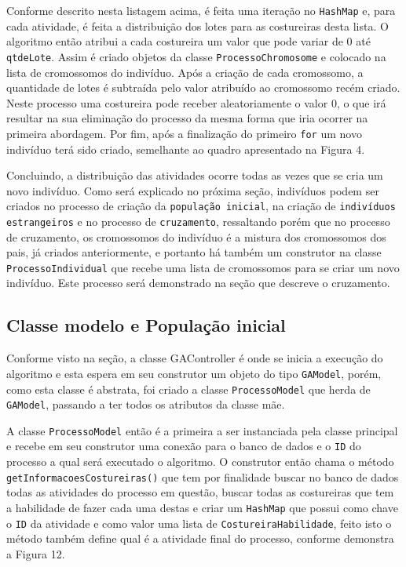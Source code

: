 \newpage
 
\par Conforme descrito nesta listagem acima, é feita uma iteração no
\texttt{HashMap} e, para cada atividade, é feita a distribuição dos lotes para
as costureiras desta lista. O algoritmo então atribui a cada costureira um valor
que pode variar de 0 até \texttt{qtdeLote}.
Assim é criado objetos da classe \texttt{ProcessoChromosome} e colocado na lista
de cromossomos do indivíduo. Após a criação de cada cromossomo, a quantidade de
lotes é subtraída pelo valor atribuído ao cromossomo recém criado.
Neste processo uma costureira pode receber aleatoriamente o valor 0, o que irá resultar na sua eliminação do processo da mesma forma
que iria ocorrer na primeira abordagem. Por fim, após a finalização do primeiro
\texttt{for} um novo indivíduo terá sido criado, semelhante ao quadro
apresentado na Figura 4.

\par Concluindo, a distribuição das atividades ocorre todas as vezes que se cria um novo indivíduo.
Como será explicado no próxima seção, indivíduos podem ser criados no processo
de criação da \texttt{população inicial}, na criação de \texttt{indivíduos estrangeiros} e no processo de \texttt{cruzamento}, ressaltando porém que no processo 
de cruzamento, os cromossomos do indivíduo é a mistura dos cromossomos dos pais,
já criados anteriormente, e portanto há também um construtor na classe \texttt{ProcessoIndividual} que recebe uma lista de cromossomos para se criar um novo indivíduo.
Este processo será demonstrado na seção que descreve o cruzamento.

\subsection {Classe modelo e População inicial}

\par Conforme visto na seção, a classe GAController é onde se inicia a execução do algoritmo e esta espera em seu 
construtor um objeto do tipo \texttt{GAModel}, porém, como esta classe é abstrata, foi criado a classe 
\texttt{ProcessoModel} que herda de \texttt{GAModel}, passando a ter todos os atributos
da classe mãe.

\par A classe \texttt{ProcessoModel} então é a primeira a ser instanciada pela classe principal e recebe em seu construtor
uma conexão para o banco de dados e o \texttt{ID} do processo a qual será
executado o algoritmo. O construtor então chama o método
\texttt{getInformacoesCostureiras()} que tem por finalidade buscar no banco de dados todas as atividades do 
processo em questão, buscar todas as costureiras que tem a habilidade de fazer
cada uma destas e criar um \texttt{HashMap} que possui como chave o \texttt{ID} da atividade e como valor uma 
lista de \texttt{CostureiraHabilidade}, feito isto o método 
também define qual é a atividade final do processo, conforme demonstra a Figura 12.


